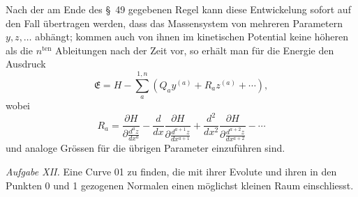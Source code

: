 \documentclass[11pt,a4paper,leqno]{article}
\begin{document}
Nach der am Ende des \S~49 gegebenen Regel kann diese Entwickelung sofort auf den Fall übertragen werden, dass das Massensystem von mehreren Parametern $y,z,\ldots$ abhängt; kommen auch von ihnen im kinetischen Potential keine höheren als die $n^{\mathrm{ten}}$ Ableitungen nach der Zeit vor, so erhält man für die Energie den Ausdruck
\[
\mathfrak E=H-\sum_a^{1,n}(Q_ay^{(a)}+R_az^{(a)}+\cdots),
\]
wobei
\[
R_a=\frac{\partial H}{\partial\frac{d^az}{dx^a}}-\frac{d}{dx}\frac{\partial H}{\partial\frac{d^{a+1}z}{dx^{a+1}}}+\frac{d^2}{dx^2}\frac{\partial H}{\partial\frac{d^{a+2}z}{dx^{a+2}}}-\cdots
\]
und analoge Grössen für die übrigen Parameter einzuführen sind.

\emph{Aufgabe XII.} Eine Curve 01 zu finden, die mit ihrer Evolute und ihren in den Punkten 0 und 1 gezogenen Normalen einen möglichst kleinen Raum einschliesst.
\end{document}
